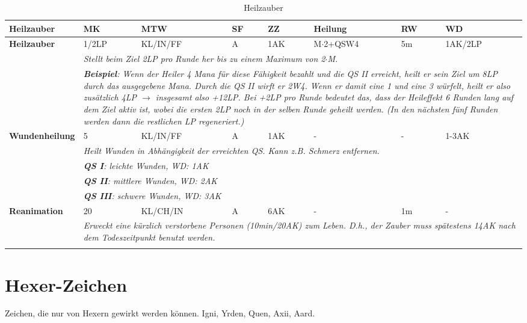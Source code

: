 \begin{longtable}{|p{4cm}|p{1.1cm}|p{2.2cm}|p{0.8cm}|p{0.8cm}|p{2.2cm}|p{0.8cm}|p{2.2cm}|}
\hline
\textbf{Heilzauber} & \textbf{MK} & \textbf{MTW} & \textbf{SF} & \textbf{ZZ} & \textbf{Heilung} & \textbf{RW} & \textbf{WD} \\

\hline
\textbf{Heilzauber} & 1/2LP & KL/IN/FF & A & 1AK & M$\cdot$2+QSW4 & 5m & 1AK/2LP \\ \hline
\multicolumn{1}{r}{} & \multicolumn{7}{|p{13cm}|}{\textit{Stellt beim Ziel 2LP pro Runde her bis zu einem Maximum von 2$\cdot$M.}} \\
\multicolumn{1}{r}{} & \multicolumn{7}{|p{13cm}|}{\textit{\textbf{Beispiel}: Wenn der Heiler 4 Mana für diese Fähigkeit bezahlt und die QS II erreicht, heilt er sein Ziel um 8LP durch das ausgegebene Mana. Durch die QS II wirft er 2W4. Wenn er damit eine 1 und eine 3 würfelt, heilt er also zusätzlich 4LP $\rightarrow$ insgesamt also +12LP. Bei +2LP pro Runde bedeutet das, dass der Heileffekt 6 Runden lang auf dem Ziel aktiv ist, wobei die ersten 2LP noch in der selben Runde geheilt werden. (In den nächsten fünf Runden werden dann die restlichen LP regeneriert.)}} \\

\hline
\textbf{Wundenheilung} & 5 & KL/IN/FF & A & 1AK & - & - & 1-3AK \\ \hline
\multicolumn{1}{r}{} & \multicolumn{7}{|p{13cm}|}{\textit{Heilt Wunden in Abhängigkeit der erreichten QS. Kann z.B. Schmerz entfernen.}} \\
\multicolumn{1}{r}{} & \multicolumn{7}{|p{13cm}|}{\textit{\textbf{QS I}: leichte Wunden, WD: 1AK}} \\
\multicolumn{1}{r}{} & \multicolumn{7}{|p{13cm}|}{\textit{\textbf{QS II}: mittlere Wunden, WD: 2AK}} \\
\multicolumn{1}{r}{} & \multicolumn{7}{|p{13cm}|}{\textit{\textbf{QS III}: schwere Wunden, WD: 3AK}} \\

\hline
\textbf{Reanimation} & 20 & KL/CH/IN & A & 6AK & - & 1m & - \\ \hline
\multicolumn{1}{r}{} & \multicolumn{7}{|p{13cm}|}{\textit{Erweckt eine kürzlich verstorbene Personen (10min/20AK) zum Leben. D.h., der Zauber muss spätestens 14AK nach dem Todeszeitpunkt benutzt werden.}} \\

\cline{2-8}
\caption{Heilzauber}
\label{tab:Heilzauber}
\end{longtable}

\section{Hexer-Zeichen}
Zeichen, die nur von Hexern gewirkt werden können. Igni, Yrden, Quen, Axii, Aard.
